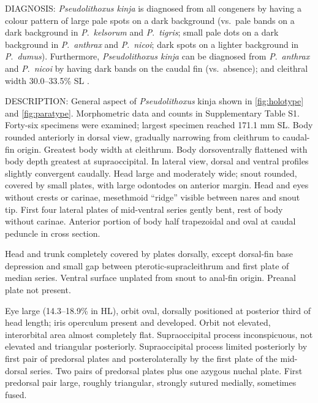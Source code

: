 \documentclass[12pt]{article}
\begin{document}
\noindent DIAGNOSIS: \emph{Pseudolithoxus kinja} is diagnosed from all congeners by having a colour pattern of large pale spots on a dark background (vs.\ pale bands on a dark background in \emph{P}.\ \emph{kelsorum} and \emph{P}.\ \emph{tigris}; small pale dots on a dark background in \emph{P}.\ \emph{anthrax} and \emph{P}.\ \emph{nicoi}; dark spots on a lighter background in \emph{P}.\ \emph{dumus}). %
Furthermore, \emph{Pseudolithoxus kinja} can be diagnosed from \emph{P}.\ \emph{anthrax} and \emph{P}.\ \emph{nicoi} by having dark bands on the caudal fin (vs.\ absence); and cleithral width 30.0--33.5\% SL \citep[vs.\ 27.2--30.5\% in \emph{P}.\ \emph{anthrax} and 27.0--28.6\% in \emph{P}.\ \emph{nicoi}; data from ][]{Armbruster2000}.\\%
\bigskip

\noindent DESCRIPTION: General aspect of \emph{Pseudolithoxus} kinja shown in \autoref{fig:holotype} and \autoref{fig:paratype}. %
Morphometric data and counts in Supplementary Table S1. %
Forty-six specimens were examined; largest specimen reached 171.1 mm SL. %
Body rounded anteriorly in dorsal view, gradually narrowing from cleithrum to caudal-fin origin. %
Greatest body width at cleithrum. %
Body dorsoventrally flattened with body depth greatest at supraoccipital. %
In lateral view, dorsal and ventral profiles slightly convergent caudally. %
Head large and moderately wide; snout rounded, covered by small plates, with large odontodes on anterior margin. %
Head and eyes without crests or carinae, mesethmoid ``ridge'' visible between nares and snout tip. %
First four lateral plates of mid-ventral series gently bent, rest of body without carinae. %
Anterior portion of body half trapezoidal and oval at caudal peduncle in cross section.%

Head and trunk completely covered by plates dorsally, except dorsal-fin base depression and small gap between pterotic-supracleithrum and first plate of median series. %
Ventral surface unplated from snout to anal-fin origin. %
Preanal plate not present.%

Eye large (14.3--18.9\% in HL), orbit oval, dorsally positioned at posterior third of head length; iris operculum present and developed. %
Orbit not elevated, interorbital area almost completely flat. %
Supraoccipital process inconspicuous, not elevated and triangular posteriorly. %
Supraoccipital process limited posteriorly by first pair of predorsal plates and posterolaterally by the first plate of the mid-dorsal series. %
Two pairs of predorsal plates plus one azygous nuchal plate. First predorsal pair large, roughly triangular, strongly sutured medially, sometimes fused.%
\end{document}
